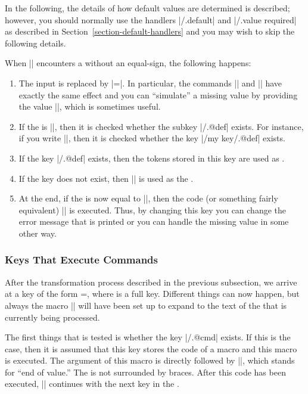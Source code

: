 In the following, the details of how default values are determined is
described; however, you should normally use the handlers |/.default|
and |/.value required| as described in
Section~\ref{section-default-handlers} and you may wish to skip
the following details.

When |\pgfkeys| encounters a  without an equal-sign, the
following happens:
\begin{enumerate}
\item The input is replaced by |=\pgfkeysnovalue|. In
  particular, the commands || and
  || have exactly the same effect and
  you can ``simulate'' a missing value by providing the value
  |\pgfkeysnovalue|, which is sometimes useful.
\item If the  is |\pgfkeysnovalue|, then it is checked
  whether the subkey |/.@def| exists. For instance, if you
  write ||, then it is checked whether the key
  |/my key/.@def| exists.
\item If the key |/.@def| exists, then the tokens stored in
  this key are used as .
\item If the key does not exist, then |\pgfkeysnovalue| is used as the
  .
\item At the end, if the  is now equal to
  |\pgfkeysvaluerequired|, then the code  (or something fairly equivalent)
  ||
  is executed. Thus, by changing this key you can change the error
  message that is printed or you can handle the missing value in some
  other way.
\end{enumerate}



\subsubsection{Keys That Execute Commands}
\label{section-key-code}

After the transformation process described in the previous subsection,
we arrive at a key of the form =, where
 is a full key. Different things can now happen, but always
the macro |\pgfkeyscurrentkey| will have been set up to expand to the
text of the  that is currently being processed.

The first things that is tested is whether the key |/.@cmd|
exists. If this is the case, then it is assumed that this key stores
the code of a macro and this macro is executed. The argument of this
macro is  directly followed by |\pgfeov|, which stands for
``end of value.'' The  is not surrounded by braces. After
this code has been executed, |\pgfkeys| continues with the next key in
the .

